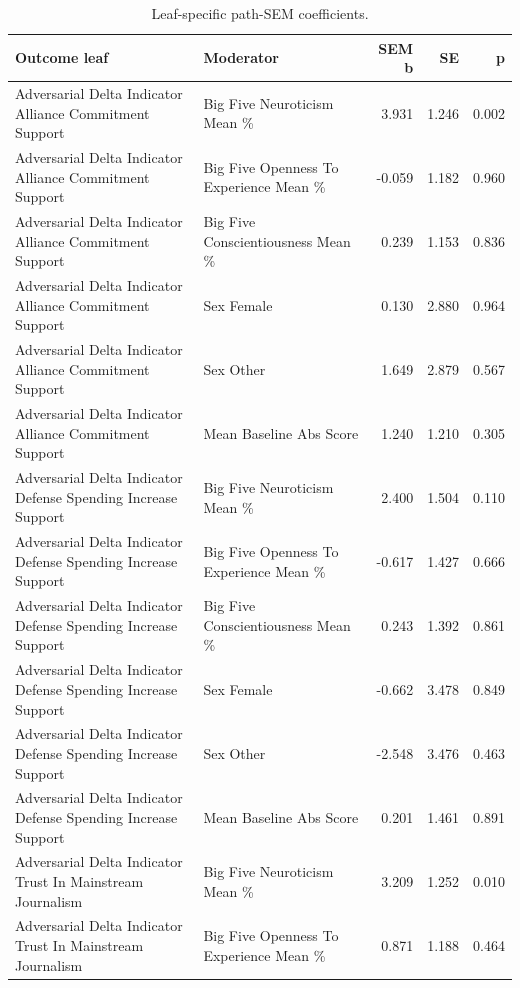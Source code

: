 \begin{table}[htbp]
\centering
\begin{threeparttable}
\caption{Leaf-specific path-SEM coefficients.}
\label{tab:sempaths}
\small
\setlength{\tabcolsep}{4.5pt}
\renewcommand{\arraystretch}{1.10}
\begin{tabular}{llrrr}
\toprule
Outcome leaf & Moderator & SEM b & SE & p \\
\midrule
Adversarial Delta Indicator Alliance Commitment Support & Big Five Neuroticism Mean \% & 3.931 & 1.246 & 0.002 \\
Adversarial Delta Indicator Alliance Commitment Support & Big Five Openness To Experience Mean \% & -0.059 & 1.182 & 0.960 \\
Adversarial Delta Indicator Alliance Commitment Support & Big Five Conscientiousness Mean \% & 0.239 & 1.153 & 0.836 \\
Adversarial Delta Indicator Alliance Commitment Support & Sex Female & 0.130 & 2.880 & 0.964 \\
Adversarial Delta Indicator Alliance Commitment Support & Sex Other & 1.649 & 2.879 & 0.567 \\
Adversarial Delta Indicator Alliance Commitment Support & Mean Baseline Abs Score & 1.240 & 1.210 & 0.305 \\
Adversarial Delta Indicator Defense Spending Increase Support & Big Five Neuroticism Mean \% & 2.400 & 1.504 & 0.110 \\
Adversarial Delta Indicator Defense Spending Increase Support & Big Five Openness To Experience Mean \% & -0.617 & 1.427 & 0.666 \\
Adversarial Delta Indicator Defense Spending Increase Support & Big Five Conscientiousness Mean \% & 0.243 & 1.392 & 0.861 \\
Adversarial Delta Indicator Defense Spending Increase Support & Sex Female & -0.662 & 3.478 & 0.849 \\
Adversarial Delta Indicator Defense Spending Increase Support & Sex Other & -2.548 & 3.476 & 0.463 \\
Adversarial Delta Indicator Defense Spending Increase Support & Mean Baseline Abs Score & 0.201 & 1.461 & 0.891 \\
Adversarial Delta Indicator Trust In Mainstream Journalism & Big Five Neuroticism Mean \% & 3.209 & 1.252 & 0.010 \\
Adversarial Delta Indicator Trust In Mainstream Journalism & Big Five Openness To Experience Mean \% & 0.871 & 1.188 & 0.464 \\

\end{tabular}
\end{threeparttable}
\end{table}
